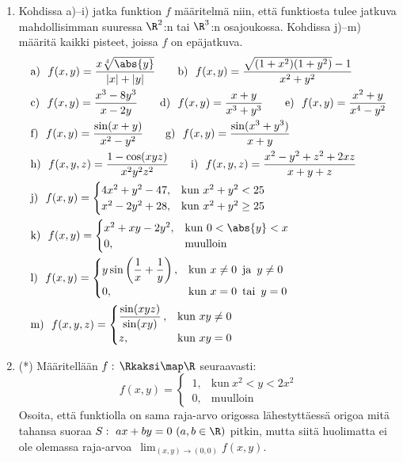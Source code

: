 \begin{enumerate}
\item
Kohdissa a)--i) jatka funktion $f$ määritelmä niin, että funktiosta tulee jatkuva
mahdollisimman suuressa $\R^2$:n tai $\R^3$:n osajoukossa. Kohdissa j)--m) määritä kaikki
pisteet, joissa $f$ on epäjatkuva. 
\begin{align*}
&\text{a)}\ \ f(x,y)=\frac{x\sqrt[4]{\abs{y}}}{|x|+|y|} \qquad
 \text{b)}\ \ f(x,y)=\frac{\sqrt{(1+x^2)(1+y^2)}-1}{x^2+y^2} \\
&\text{c)}\ \ f(x,y)=\frac{x^3-8y^3}{x-2y} \qquad
 \text{d)}\ \ f(x,y)=\frac{x+y}{x^3+y^3} \qquad
 \text{e)}\ \ f(x,y)=\frac{x^2+y}{x^4-y^2} \\
&\text{f)}\ \ f(x,y)=\frac{\sin(x+y)}{x^2-y^2} \qquad
 \text{g)}\ \ f(x,y)=\frac{\sin(x^3+y^3)}{x+y} \\
&\text{h)}\ \ f(x,y,z)=\frac{1-\cos(xyz)}{x^2y^2z^2} \qquad
 \text{i)}\ \ f(x,y,z)=\frac{x^2-y^2+z^2+2xz}{x+y+z} \\
&\text{j)}\ \ f(x,y)=\begin{cases}
              4x^2+y^2-47, &\text{kun}\ x^2+y^2<25 \\ x^2-2y^2+28, &\text{kun}\ x^2+y^2 \ge 25
              \end{cases} \\
&\text{k)}\ \ f(x,y)=\begin{cases}
                     x^2+xy-2y^2, &\text{kun}\ 0<\abs{y}<x \\ 0, &\text{muulloin}
                     \end{cases} \\
&\text{l)}\ \ f(x,y)=
 \begin{cases}
 y\sin\left(\dfrac{1}{x}+\dfrac{1}{y}\right), &\text{kun}\ x \neq 0\,\ \text{ja}\,\ y \neq 0 \\
 0, &\text{kun}\ x=0\,\ \text{tai}\,\ y=0
 \end{cases} \\
&\text{m)}\ \ f(x,y,z)=\begin{cases}
                       \dfrac{\sin(xyz)}{\sin(xy)}\,, &\text{kun}\ xy \neq 0 \\
                       z, &\text{kun}\ xy=0
                       \end{cases}
\end{align*}

\item (*) \label{H-udif-1: kiero raja-arvo}
Määritellään $f:\,\Rkaksi\map\R$ seuraavasti:
\[
f(x,y)=\begin{cases} 
       \,1, &\text{kun}\ x^2<y<2 x^2\\ \,0, &\text{muulloin}
       \end{cases}
\]
Osoita, että funktiolla on sama raja-arvo origossa lähestyttäessä origoa mitä
tahansa suoraa $S:\ ax+by=0\ (a,b\in\R)$ pitkin, mutta siitä huolimatta ei ole olemassa
raja-arvoa $\,\lim_{(x,y)\to (0,0)} f(x,y)$.


\end{enumerate}
